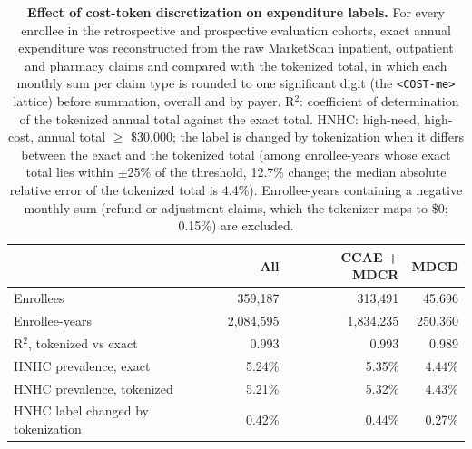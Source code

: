 \begin{table}[H]
\centering
\caption{\textbf{Effect of cost-token discretization on expenditure labels.} For every enrollee in the retrospective and prospective evaluation cohorts, exact annual expenditure was reconstructed from the raw MarketScan inpatient, outpatient and pharmacy claims and compared with the tokenized total, in which each monthly sum per claim type is rounded to one significant digit (the \texttt{<COST-me>} lattice) before summation, overall and by payer. R$^2$: coefficient of determination of the tokenized annual total against the exact total. HNHC: high-need, high-cost, annual total $\geq$ \$30{,}000; the label is changed by tokenization when it differs between the exact and the tokenized total (among enrollee-years whose exact total lies within $\pm$25\% of the threshold, 12.7\% change; the median absolute relative error of the tokenized total is 4.4\%). Enrollee-years containing a negative monthly sum (refund or adjustment claims, which the tokenizer maps to \$0; 0.15\%) are excluded.}
\label{tab:discretization}
\small
\renewcommand{\arraystretch}{1.15}
\begin{tabular}{@{}lrrr@{}}
\hline
 & \textbf{All} & \textbf{CCAE + MDCR} & \textbf{MDCD} \\
\hline
Enrollees & 359,187 & 313,491 & 45,696 \\
Enrollee-years & 2,084,595 & 1,834,235 & 250,360 \\
R$^2$, tokenized vs exact & 0.993 & 0.993 & 0.989 \\
HNHC prevalence, exact & 5.24\% & 5.35\% & 4.44\% \\
HNHC prevalence, tokenized & 5.21\% & 5.32\% & 4.43\% \\
HNHC label changed by tokenization & 0.42\% & 0.44\% & 0.27\% \\
\hline
\end{tabular}
\end{table}
